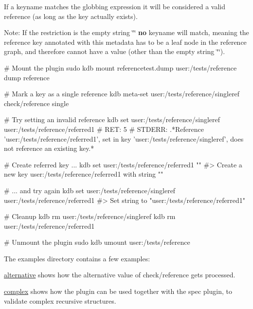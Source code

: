 If a keyname matches the globbing expression it will be considered a valid reference (as long as the key actually exists).

Note\+: If the restriction is the empty string {\ttfamily \char`\"{}\char`\"{}} {\bfseries no} keyname will match, meaning the reference key annotated with this metadata has to be a leaf node in the reference graph, and therefore cannot have a value (other than the empty string {\ttfamily \char`\"{}\char`\"{}}).


\begin{DoxyCode}
# Mount the plugin
sudo kdb mount referencetest.dump user:/tests/reference dump reference

# Mark a key as a single reference
kdb meta-set user:/tests/reference/singleref check/reference single

# Try setting an invalid reference
kdb set user:/tests/reference/singleref user:/tests/reference/referred1
# RET: 5
# STDERR: .*Reference 'user:/tests/reference/referred1', set in key 'user:/tests/reference/singleref', does
       not reference an existing key.*

# Create referred key ...
kdb set user:/tests/reference/referred1 ""
#> Create a new key user:/tests/reference/referred1 with string ""

# ... and try again
kdb set user:/tests/reference/singleref user:/tests/reference/referred1
#> Set string to "user:/tests/reference/referred1"

# Cleanup
kdb rm user:/tests/reference/singleref
kdb rm user:/tests/reference/referred1

# Unmount the plugin
sudo kdb umount user:/tests/reference
\end{DoxyCode}


The examples directory contains a few examples\+:


\begin{DoxyItemize}
\item \hyperlink{autotoc_md561_src_plugins_reference_examples_alternative_README_md}{alternative} shows how the {\ttfamily alternative} value of {\ttfamily check/reference} gets processed.
\item \hyperlink{autotoc_md562_src_plugins_reference_examples_complex_README_md}{complex} shows how the plugin can be used together with the spec plugin, to validate complex recursive structures. 
\end{DoxyItemize}
